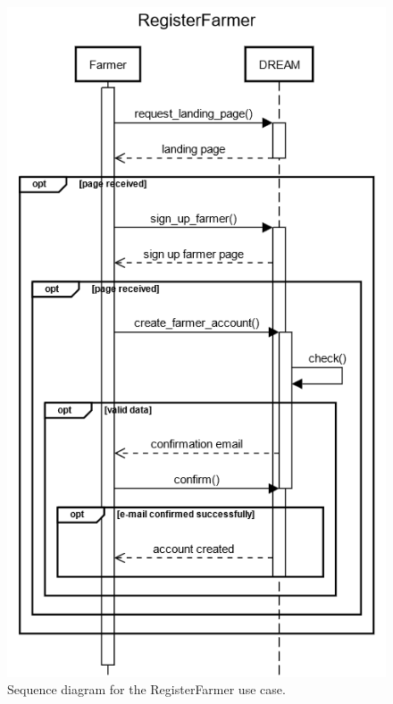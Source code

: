 \documentclass{article}
\begin{document}
\begin{figure}[H]
    \centering
    \includegraphics[scale=0.60]{sequence_diagrams/RegisterFarmer.png}
    \caption{Sequence diagram for the RegisterFarmer use case.}
\end{figure}
\newpage
\end{document}
